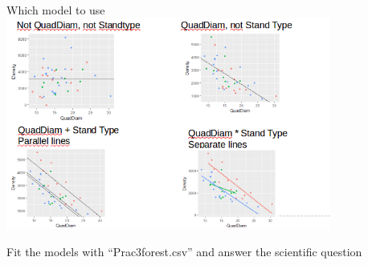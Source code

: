 \documentclass[10pt]{beamer}
\begin{document}
\begin{frame}{Which model to use}
 \includegraphics[width=0.8\textwidth]{Figures/tree4mod}
 
 Fit the models with ``Prac3forest.csv'' and answer the scientific question
\end{frame}
\end{document}
